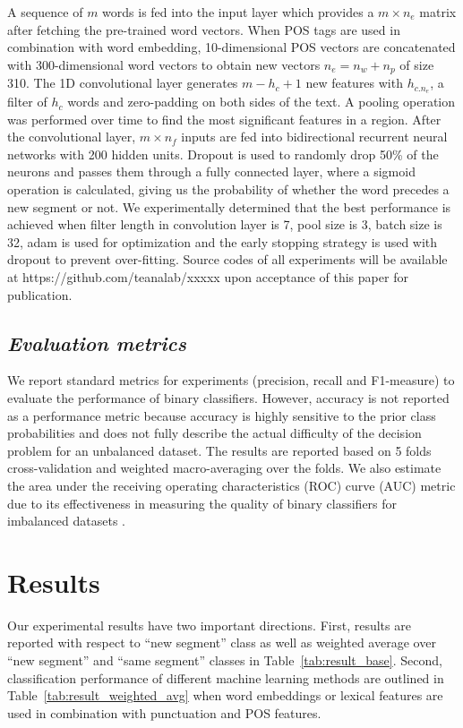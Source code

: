 \documentclass{amia}
\begin{document}
A sequence of $m$ words is fed into the input layer which provides a $m \times n_e$ matrix after fetching the pre-trained word vectors. When POS tags are used in combination with word embedding, 10-dimensional POS vectors are concatenated with 300-dimensional word vectors to obtain new vectors $n_e = n_w + n_p$ of size 310. The 1D convolutional layer generates $m - h_c + 1$ new features with $h_{c.n_e}$, a filter of $h_c$ words and zero-padding on both sides of the text. A pooling operation was performed over time to find the most significant features in a region. After the convolutional layer, $m \times n_f$ inputs are fed into bidirectional recurrent neural networks with 200 hidden units. Dropout is used to randomly drop 50\% of the neurons and passes them through a fully connected layer, where a sigmoid operation is calculated, giving us the probability of whether the word precedes a new segment or not. We experimentally determined that the best performance is achieved when filter length in convolution layer is 7, pool size is 3, batch size is 32, adam\cite{kingma2014adam} is used for optimization and the early stopping strategy is used with dropout to prevent over-fitting. Source codes of all experiments will be available at https://github.com/teanalab/xxxxx upon acceptance of this paper for publication.                    
  
\subsection*{\textit{Evaluation metrics}}
We report standard metrics for experiments (precision, recall and F1-measure) to evaluate the performance of binary classifiers\cite{aas1999text}. However, accuracy is not reported as a performance metric because accuracy is highly sensitive to the prior class probabilities and does not fully describe the actual difficulty of the decision problem for an unbalanced dataset. The results are reported based on 5 folds cross-validation and weighted macro-averaging over the folds. We also estimate the area under the receiving operating characteristics (ROC) curve\cite{kumar2011receiver} (AUC) metric due to its effectiveness in measuring the quality of binary classifiers for imbalanced datasets \cite{hu2015kernelized}. 

\section*{Results}
Our experimental results have two important directions. First, results are reported with respect to ``new segment'' class as well as weighted average over ``new segment'' and ``same segment'' classes in Table~\ref{tab:result_base}. Second, classification performance of different machine learning methods are outlined in Table~\ref{tab:result_weighted_avg} when word embeddings or lexical features are used in combination with punctuation and POS features.\\
\end{document}
